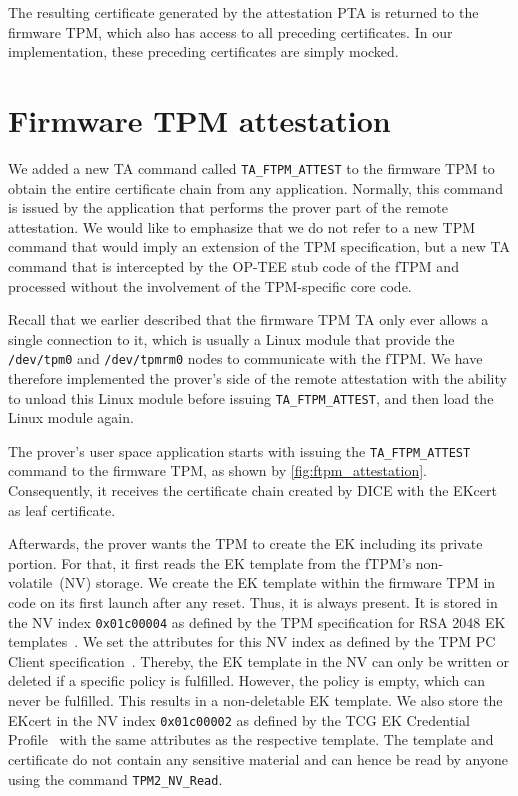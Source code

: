 The resulting certificate generated by the attestation PTA is returned to the firmware TPM, which also has access to all preceding certificates.
In our implementation, these preceding certificates are simply mocked.

\section{Firmware TPM attestation}\label{sec:impl_ftpm_attestation}



We added a new TA command called \texttt{TA\_FTPM\_ATTEST} to the firmware TPM to obtain the entire certificate chain from any application.
Normally, this command is issued by the application that performs the prover part of the remote attestation.
We would like to emphasize that we do not refer to a new TPM command that would imply an extension of the TPM specification, but a new TA command that is intercepted by the OP-TEE stub code of the fTPM and processed without the involvement of the TPM-specific core code.

Recall that we earlier described that the firmware TPM TA only ever allows a single connection to it, which is usually a Linux module that provide the \texttt{/dev/tpm0} and \texttt{/dev/tpmrm0} nodes to communicate with the fTPM\@.
We have therefore implemented the prover's side of the remote attestation with the ability to unload this Linux module before issuing \texttt{TA\_FTPM\_ATTEST}, and then load the Linux module again.

The prover's user space application starts with issuing the \texttt{TA\_FTPM\_ATTEST} command to the firmware TPM, as shown by \autoref{fig:ftpm_attestation}.
Consequently, it receives the certificate chain created by DICE with the EKcert as leaf certificate.

Afterwards, the prover wants the TPM to create the EK including its private portion.
For that, it first reads the EK template from the fTPM's non-volatile~(NV) storage.
We create the EK template within the firmware TPM in code on its first launch after any reset.
Thus, it is always present.
It is stored in the NV index \texttt{0x01c00004} as defined by the TPM specification for RSA 2048 EK templates~\cite{tcg-ek}.
We set the attributes for this NV index as defined by the TPM PC Client specification~\cite{tcgPcClient}. %
Thereby, the EK template in the NV can only be written or deleted if a specific policy is fulfilled.
However, the policy is empty, which can never be fulfilled.
This results in a non-deletable EK template.
We also store the EKcert in the NV index \texttt{0x01c00002} as defined by the TCG EK Credential Profile~\cite{tcg-ek} with the same attributes as the respective template.
The template and certificate do not contain any sensitive material and can hence be read by anyone using the command \texttt{TPM2\_NV\_Read}.


